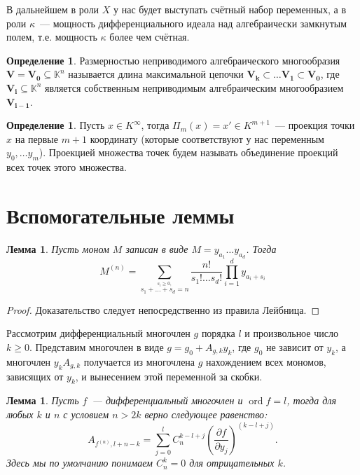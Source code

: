\documentclass[16pt]{article}
\DeclareMathOperator{\ord}{ord}
\renewcommand{\ge}{\geqslant} %
\theoremstyle{plain}
\newtheorem{lemma}[theorem]{Лемма}
\theoremstyle{definition}
\newtheorem{definition}[theorem]{Определение}
\theoremstyle{remark}
\begin{document}
В дальнейшем в роли $X$ у нас будет выступать счётный набор
переменных, а в роли $\kappa$~--- мощность дифференциального идеала
над алгебраически замкнутым полем, т.е. мощность $\kappa$
более чем счётная.


\begin{definition} Размерностью неприводимого алгебраического многообразия
$\mathbf{V}=\mathbf{V_0}\subseteq \mathbb{K}^n$ называется длина максимальной цепочки
$\mathbf{V_k}\subset\ldots\mathbf{V_1}\subset\mathbf{V_0}$, где
$\mathbf{V_i}\subseteq \mathbb{K}^n$ является собственным неприводимым алгебраическим многообразием
$\mathbf{V_{i-1}}$.
\end{definition}

\begin{definition}
Пусть $x\in K^{\infty}$, тогда $\Pi_m(x)=x'\in K^{m+1}$~--- проекция
точки $x$ на первые $m+1$ координату (которые соответствуют у нас
переменным $y_0,\ldots y_m$). Проекцией множества точек будем называть объединение проекций всех точек этого множества.
\end{definition}

\section{ Вспомогательные леммы}


\begin{lemma}\label{lemma:der_monom}
Пусть моном $M$ записан в виде $M=y_{a_1}\ldots y_{a_d}$. Тогда
$$
M^{(n)} =\sum\limits_{\stackrel{s_i\geqslant0,}{
s_1+\ldots+s_d=n}}\frac{n!}{s_1!\ldots s_d!}
\prod\limits_{i=1}^dy_{a_i+s_i}
$$
\end{lemma}
\begin{proof}
Доказательство следует непосредственно из правила Лейбница.
\end{proof}
Рассмотрим дифференциальный многочлен $g$ порядка $l$ и произвольное
число $k\ge0$. Представим многочлен в виде $g=g_0+A_{g,k}y_k$, где
$g_0$ не зависит от $y_k$, а многочлен $y_kA_{g,k}$ получается из
многочлена $g$ нахождением всех мономов, зависящих от $y_k$, и
вынесением этой переменной за скобки.


\begin{lemma}\label{lemma:A_fn}
Пусть $f$~--- дифференциальный многочлен и $\ord f = l$, тогда
для любых $k$ и $n$ с условием $n>2k$ верно следующее
равенство:
$$
A_{f^{(n)}, l + n - k}=\sum\limits_{j=0}^{l}C_n^{k - l + j
}\left(\frac{\partial f}{\partial y_j}\right)^{(k - l + j)}.
$$
Здесь мы по умолчанию понимаем $C_n^{k}=0$ для отрицательных
$k$.
\end{lemma}
\end{document}
